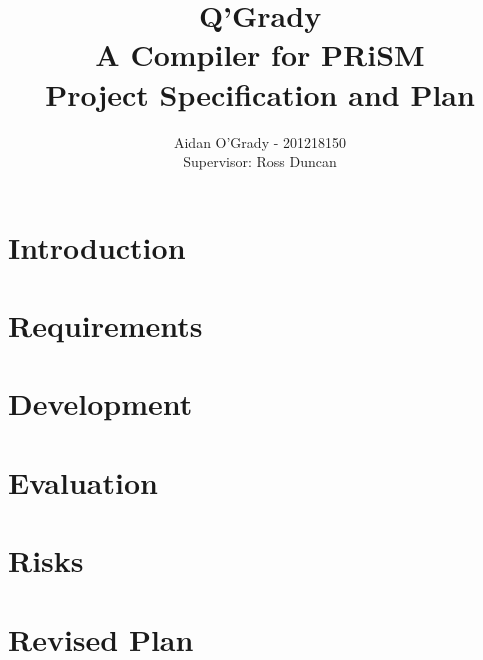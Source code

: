 \documentclass[11pt, a4paper]{article}
\begin{document}
\title{Q'Grady \\A Compiler for PRiSM \\
\large{Project Specification and Plan}}
\author{Aidan O'Grady - 201218150\\Supervisor: Ross Duncan}
\date{}
\maketitle

\section{Introduction} %
\label{sec:introduction}



\section{Requirements} %
\label{sec:requirements}



\section{Development} %
\label{sec:development_process}



\section{Evaluation} %
\label{sec:evaluation}



\section{Risks} %
\label{sec:risks}



\section{Revised Plan} %
\label{sec:revised_plan}

\end{document}
